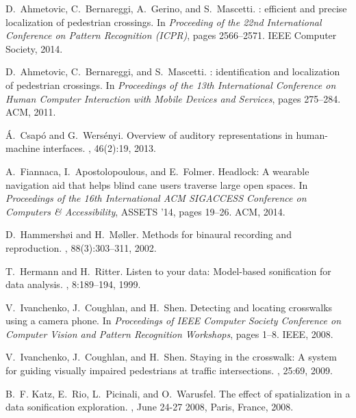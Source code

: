 \documentclass{article}
\begin{document}
\begin{thebibliography}{10}

D.~Ahmetovic, C.~Bernareggi, A.~Gerino, and S.~Mascetti.
: efficient and precise localization of pedestrian
  crossings.
\newblock In {\em Proceeding of the 22nd International Conference on Pattern
  Recognition (ICPR)}, pages 2566--2571. IEEE Computer Society, 2014.

D.~Ahmetovic, C.~Bernareggi, and S.~Mascetti.
: identification and localization of pedestrian
  crossings.
\newblock In {\em Proceedings of the 13th International Conference on Human
  Computer Interaction with Mobile Devices and Services}, pages 275--284. ACM,
  2011.

{\'A}.~Csap{\'o} and G.~Wers{\'e}nyi.
\newblock Overview of auditory representations in human-machine interfaces.
, 46(2):19, 2013.

A.~Fiannaca, I.~Apostolopoulous, and E.~Folmer.
\newblock Headlock: A wearable navigation aid that helps blind cane users
  traverse large open spaces.
\newblock In {\em Proceedings of the 16th International ACM SIGACCESS
  Conference on Computers \& Accessibility}, ASSETS '14, pages 19--26. ACM,
  2014.

D.~Hammersh{\o}i and H.~M{\o}ller.
\newblock Methods for binaural recording and reproduction.
, 88(3):303--311, 2002.

T.~Hermann and H.~Ritter.
\newblock Listen to your data: Model-based sonification for data analysis.
,
  8:189--194, 1999.

V.~Ivanchenko, J.~Coughlan, and H.~Shen.
\newblock Detecting and locating crosswalks using a camera phone.
\newblock In {\em Proceedings of IEEE Computer Society Conference on Computer
  Vision and Pattern Recognition Workshops}, pages 1--8. IEEE, 2008.

V.~Ivanchenko, J.~Coughlan, and H.~Shen.
\newblock Staying in the crosswalk: A system for guiding visually impaired
  pedestrians at traffic intersections.
, 25:69, 2009.

B.~F. Katz, E.~Rio, L.~Picinali, and O.~Warusfel.
\newblock The effect of spatialization in a data sonification exploration.
, June 24-27 2008, Paris, France, 2008.


\end{thebibliography}
\end{document}
